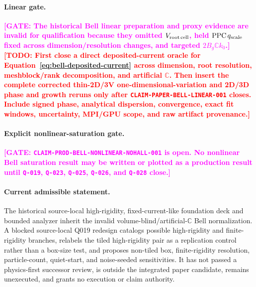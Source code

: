 \documentclass[twocolumn]{aastex701}
\newcommand{\TODO}[1]{\textcolor{red}{\textbf{[TODO: #1]}}}
\newcommand{\GATE}[1]{\textcolor{magenta}{\textbf{[GATE: #1]}}}
\newcommand{\claimid}[1]{\texttt{#1}}
\newcommand{\qgate}[1]{\texttt{#1}}
\begin{document}
\paragraph{Linear gate.}
\GATE{The historical Bell linear preparation and proxy evidence are invalid for
qualification because they omitted $V_{\rm root\,cell}$, held
${\rm PPC}\,q_{\rm scale}$ fixed across dimension/resolution changes, and
targeted $2B_g\mathbb{C}k_0$.}
\TODO{First close a direct deposited-current oracle for
Equation~\ref{eq:bell-deposited-current} across dimension, root resolution,
meshblock/rank decomposition, and artificial $\mathbb{C}$. Then insert the
complete corrected thin-2D/3V one-dimensional-variation and 2D/3D phase and
growth reruns only after
\claimid{CLAIM-PAPER-BELL-LINEAR-001} closes. Include signed phase, analytical
dispersion, convergence, exact fit windows, uncertainty, MPI/GPU scope, and raw
artifact provenance.}

\paragraph{Explicit nonlinear-saturation gate.}
\GATE{\claimid{CLAIM-PROD-BELL-NONLINEAR-NOHALL-001} is open. No nonlinear Bell
saturation result may be written or plotted as a production result until
\qgate{Q-019}, \qgate{Q-023}, \qgate{Q-025}, \qgate{Q-026}, and \qgate{Q-028}
close.}
\paragraph{Current admissible statement.}
The historical source-local high-rigidity, fixed-current-like foundation deck
and bounded analyzer inherit the invalid volume-blind/artificial-$\mathbb{C}$
Bell normalization. A blocked source-local Q019 redesign catalogs possible
high-rigidity and finite-rigidity branches, relabels the tiled high-rigidity
pair as a replication control rather than a box-size test, and proposes
non-tiled box, finite-rigidity resolution, particle-count, quiet-start, and
noise-seeded sensitivities. It has not passed a physics-first successor review,
is outside the integrated paper candidate, remains unexecuted, and grants no
execution or claim authority.
\end{document}
